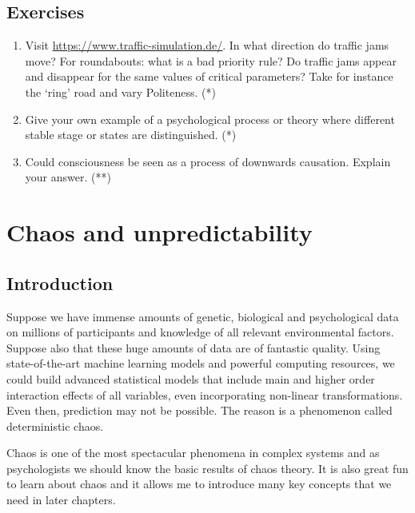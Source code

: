 \documentclass[
  a4paper,
  DIV=11,
  numbers=noendperiod,
  oneside]{scrreprt}
\begin{document}
\hypertarget{sec-Exercises}{%
\section{Exercises}\label{sec-Exercises}}

\begin{enumerate}
\def\labelenumi{\arabic{enumi})}
\item
  Visit \url{https://www.traffic-simulation.de/}. In what direction do
  traffic jams move? For roundabouts: what is a bad priority rule? Do
  traffic jams appear and disappear for the same values of critical
  parameters? Take for instance the `ring' road and vary Politeness. (*)
\item
  Give your own example of a psychological process or theory where
  different stable stage or states are distinguished. (*)
\item
  Could consciousness be seen as a process of downwards causation.
  Explain your answer. (**)
\end{enumerate}


\hypertarget{sec-ch2}{%
\chapter{Chaos and unpredictability}\label{sec-ch2}}

\hypertarget{sec-Introduction}{%
\section{Introduction}\label{sec-Introduction}}

Suppose we have immense amounts of genetic, biological and psychological
data on millions of participants and knowledge of all relevant
environmental factors. Suppose also that these huge amounts of data are
of fantastic quality. Using state-of-the-art machine learning models and
powerful computing resources, we could build advanced statistical models
that include main and higher order interaction effects of all variables,
even incorporating non-linear transformations. Even then, prediction may
not be possible. The reason is a phenomenon called deterministic chaos.

Chaos is one of the most spectacular phenomena in complex systems and as
psychologists we should know the basic results of chaos theory. It is
also great fun to learn about chaos and it allows me to introduce many
key concepts that we need in later chapters.
\end{document}
